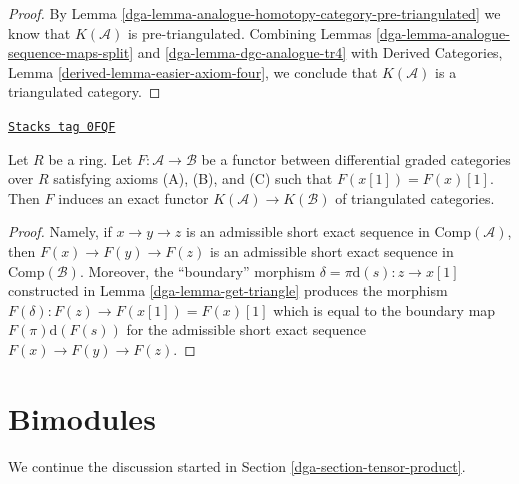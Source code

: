 \begin{proof}

By Lemma \ref{dga-lemma-analogue-homotopy-category-pre-triangulated} we know that
$K(\mathcal{A})$ is pre-triangulated. Combining
Lemmas \ref{dga-lemma-analogue-sequence-maps-split} and
\ref{dga-lemma-dgc-analogue-tr4} with
Derived Categories, Lemma \ref{derived-lemma-easier-axiom-four},
we conclude that $K(\mathcal{A})$ is a triangulated category.
\end{proof}

\begin{lemma}
\label{dga-lemma-functor-between-ABC}
\href{https://stacks.math.columbia.edu/tag/0FQF}{\texttt{Stacks tag 0FQF}}

Let $R$ be a ring. Let $F : \mathcal{A} \to \mathcal{B}$ be a functor
between differential graded categories over $R$ satisfying axioms
(A), (B), and (C) such that $F(x[1]) = F(x)[1]$.
Then $F$ induces an exact functor
$K(\mathcal{A}) \to K(\mathcal{B})$ of triangulated categories.
\end{lemma}

\begin{proof}

Namely, if $x \to y \to z$ is an admissible short exact sequence
in $\text{Comp}(\mathcal{A})$, then $F(x) \to F(y) \to F(z)$
is an admissible short exact sequence in $\text{Comp}(\mathcal{B})$.
Moreover, the ``boundary'' morphism $\delta = \pi\text{d}(s) : z \to x[1]$
constructed in Lemma \ref{dga-lemma-get-triangle} produces the morphism
$F(\delta) : F(z) \to F(x[1]) = F(x)[1]$ which is equal to the boundary
map $F(\pi) \text{d}(F(s))$ for the admissible short exact sequence
$F(x) \to F(y) \to F(z)$.
\end{proof}

\section{Bimodules}
\label{dga-section-bimodules}
We continue the discussion started in Section \ref{dga-section-tensor-product}.

